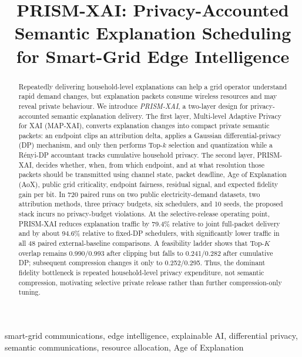 \documentclass[conference]{IEEEtran}
\newcommand{\method}{PRISM-XAI}
\newcommand{\mapxai}{MAP-XAI}
\begin{document}
\title{PRISM-XAI: Privacy-Accounted Semantic Explanation Scheduling for Smart-Grid Edge Intelligence}
\author{}

\maketitle

\begin{abstract}
Repeatedly delivering household-level explanations can help a grid
operator understand rapid demand changes, but explanation packets consume
wireless resources and may reveal private behaviour. We introduce
\emph{PRISM-XAI}, a two-layer design for privacy-accounted semantic
explanation delivery. The first layer, Multi-level Adaptive Privacy for
XAI (\mapxai{}), converts explanation changes into compact private
semantic packets: an endpoint clips an attribution delta, applies a
Gaussian differential-privacy (DP) mechanism, and only then performs
Top-$k$ selection and quantization while a R\'enyi-DP accountant tracks
cumulative household privacy. The second layer, \method{}, decides
whether, when, from which endpoint, and at what resolution those packets
should be transmitted using channel state, packet deadline, Age of
Explanation (AoX), public grid criticality, endpoint fairness, residual
signal, and expected fidelity gain per bit. In 720 paired runs on two
public electricity-demand datasets, two attribution methods, three
privacy budgets, six schedulers, and 10 seeds, the proposed stack incurs
no privacy-budget violations. At the selective-release operating point,
\method{} reduces explanation traffic by 79.4\% relative to joint
full-packet delivery and by about 94.6\% relative to fixed-DP schedulers,
with significantly lower traffic in all 48 paired external-baseline
comparisons. A feasibility ladder shows that Top-$K$ overlap remains
0.990/0.993 after clipping but falls to 0.241/0.282 after cumulative DP;
subsequent compression changes it only to 0.252/0.295. Thus, the dominant
fidelity bottleneck is repeated household-level privacy expenditure, not
semantic compression, motivating selective private release rather than
further compression-only tuning.
\end{abstract}

\begin{IEEEkeywords}
smart-grid communications, edge intelligence, explainable AI,
differential privacy, semantic communications, resource allocation,
Age of Explanation
\end{IEEEkeywords}
\end{document}
